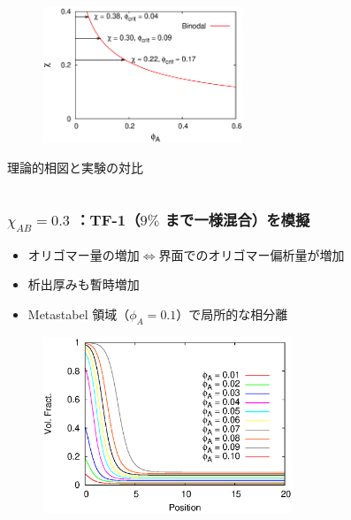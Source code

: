 \documentclass[unicode,12pt]{beamer}%
\begin{document}
\begin{frame}
\begin{columns}
\begin{column}{6.0cm}
		\begin{figure}[htbp]
			\begin{center}
				\includegraphics[width=60mm]{PD_6_600_3.eps}
			\end{center}
		\end{figure}
		\begin{center}
			\vspace{-1\baselineskip}
			{\footnotesize 理論的相図と実験の対比}
		\end{center}
	\end{column}
\end{columns}

\end{frame}

\begin{frame}\frametitle{$\chi_{AB} = 0.3$ ：TF-1（$9\%$ まで一様混合）を模擬}

\begin{itemize}
	\item オリゴマー量の増加$\Leftrightarrow$界面でのオリゴマー偏析量が増加
	\item 析出厚みも暫時増加
	\item Metastabel 領域（$\phi_A = 0.1$）で局所的な相分離
\end{itemize}

\vspace{-0.5\baselineskip}
\begin{figure}[htbp]
	\begin{center}
		\includegraphics[width=75mm]{A6_B600_Chi_03_chiS_0.0_all.eps}
	\end{center}
\end{figure}
\end{frame}
\end{document}
